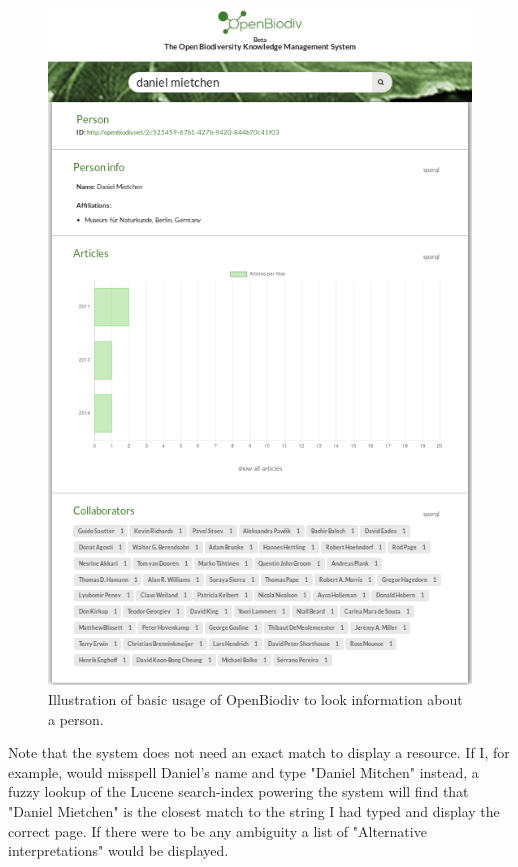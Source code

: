 \begin{figure}
\centering
\includegraphics[width=\textwidth]{Figures/basic-level.png}
\decoRule
\caption{Illustration of basic usage of OpenBiodiv to look information about a person.}
\label{fig:basic-level}
\end{figure}

Note that the system does not need an exact match to display a resource. If I, for example, would misspell Daniel's name and type "Daniel Mitchen" instead, a fuzzy lookup of the Lucene search-index powering the system will find that "Daniel Mietchen" is the closest match to the string I had typed and display the correct page. If there were to be any ambiguity a list of "Alternative interpretations" would be displayed.


